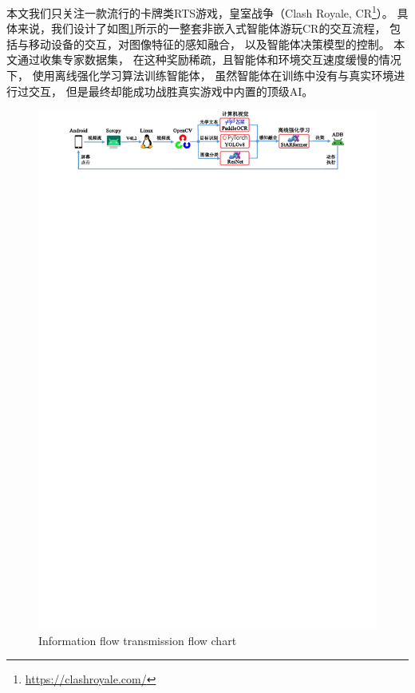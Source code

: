 \documentclass[openany,twoside,nofonts,AutoFakeBold,UTF8]{ctexbook}
\begin{document}
本文我们只关注一款流行的卡牌类RTS游戏，皇室战争（Clash Royale, CR\footnote{\url{https://clashroyale.com/}}）。
具体来说，我们设计了如图\ref{fig-framework}所示的一整套非嵌入式智能体游玩CR的交互流程，
包括与移动设备的交互，对图像特征的感知融合，
以及智能体决策模型的控制。
本文通过收集专家数据集，
在这种奖励稀疏，且智能体和环境交互速度缓慢的情况下，
使用离线强化学习算法训练智能体，
虽然智能体在训练中没有与真实环境进行过交互，
但是最终却能成功战胜真实游戏中内置的顶级AI。
\begin{figure}[htbp]
  \centering
  \includegraphics[width=\textwidth]{figures/framework.pdf}
  \caption{Information flow transmission flow chart}\label{fig-framework}
\end{figure}
\end{document}
